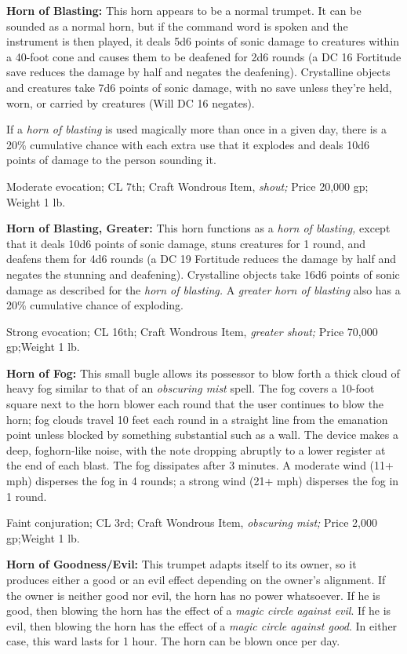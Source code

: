 \documentclass{article}
\begin{document}
\textbf{Horn of Blasting: }This horn appears to be a normal trumpet. It can be 
sounded as a normal horn, but if the command word is spoken and the instrument 
is then played, it deals 5d6 points of sonic damage to creatures within a 40-foot 
cone and causes them to be deafened for 2d6 rounds (a DC 16 Fortitude save reduces 
the damage by half and negates the deafening). Crystalline objects and creatures 
take 7d6 points of sonic damage, with no save unless they're held, worn, or carried 
by creatures (Will DC 16 negates).

If a \textit{horn of blasting }is used magically more than once in a given day, 
there is a 20\% cumulative chance with each extra use that it explodes and deals 
10d6 points of damage to the person sounding it.

Moderate evocation; CL 7th; Craft Wondrous Item, \textit{shout; }Price 20,000 gp; 
Weight 1 lb.

\textbf{Horn of Blasting, Greater:} This horn functions as a \textit{horn of blasting, 
}except that it deals 10d6 points of sonic damage, stuns creatures for 1 round, 
and deafens them for 4d6 rounds (a DC 19 Fortitude reduces the damage by half and 
negates the stunning and deafening). Crystalline objects take 16d6 points of sonic 
damage as described for the \textit{horn of blasting. }A \textit{greater horn of 
blasting }also has a 20\% cumulative chance of exploding.

Strong evocation; CL 16th; Craft Wondrous Item, \textit{greater shout; }Price 70,000 
gp;Weight 1 lb.

\textbf{Horn of Fog: }This small bugle allows its possessor to blow forth a thick 
cloud of heavy fog similar to that of an \textit{obscuring mist }spell. The fog 
covers a 10-foot square next to the horn blower each round that the user continues 
to blow the horn; fog clouds travel 10 feet each round in a straight line from 
the emanation point unless blocked by something substantial such as a wall. The 
device makes a deep, foghorn-like noise, with the note dropping abruptly to a lower 
register at the end of each blast. The fog dissipates after 3 minutes. A moderate 
wind (11+ mph) disperses the fog in 4 rounds; a strong wind (21+ mph) disperses 
the fog in 1 round.

Faint conjuration; CL 3rd; Craft Wondrous Item, \textit{obscuring mist; }Price 
2,000 gp;Weight 1 lb.

\textbf{Horn of Goodness/Evil:} This trumpet adapts itself to its owner, so it 
produces either a good or an evil effect depending on the owner's alignment. If 
the owner is neither good nor evil, the horn has no power whatsoever. If he is 
good, then blowing the horn has the effect of a \textit{magic circle against evil}. 
If he is evil, then blowing the horn has the effect of a \textit{magic circle against 
good}. In either case, this ward lasts for 1 hour. The horn can be blown once per 
day.
\end{document}
